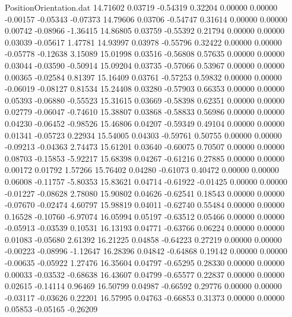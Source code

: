 \begin{filecontents}{PositionOrientation.dat}
  14.71602    0.03719   -0.54319     0.32204    0.00000    0.00000   -0.00157   -0.05343   -0.07373
  14.79606    0.03706   -0.54747     0.31614    0.00000    0.00000    0.00742   -0.08966   -1.36415
  14.86805    0.03759   -0.55392     0.21794    0.00000    0.00000    0.03039   -0.05617    1.47781
  14.93997    0.03978   -0.55796     0.32422    0.00000    0.00000   -0.05778   -0.12638    3.15089
  15.01998    0.03516   -0.56808     0.57635    0.00000    0.00000    0.03044   -0.03590   -0.50914
  15.09204    0.03735   -0.57066     0.53967    0.00000    0.00000    0.00365   -0.02584    0.81397
  15.16409    0.03761   -0.57253     0.59832    0.00000    0.00000   -0.06019   -0.08127    0.81534
  15.24408    0.03280   -0.57903     0.66353    0.00000    0.00000    0.05393   -0.06880   -0.55523
  15.31615    0.03669   -0.58398     0.62351    0.00000    0.00000    0.02779   -0.06047   -0.74610
  15.38807    0.03868   -0.58833     0.56986    0.00000    0.00000    0.04230   -0.06452   -0.98526
  15.46806    0.04207   -0.59349     0.49104    0.00000    0.00000    0.01341   -0.05723    0.22934
  15.54005    0.04303   -0.59761     0.50755    0.00000    0.00000   -0.09213   -0.04363    2.74473
  15.61201    0.03640   -0.60075     0.70507    0.00000    0.00000    0.08703   -0.15853   -5.92217
  15.68398    0.04267   -0.61216     0.27885    0.00000    0.00000    0.00172    0.01792    1.57266
  15.76402    0.04280   -0.61073     0.40472    0.00000    0.00000    0.06008   -0.11757   -5.80353
  15.83621    0.04714   -0.61922    -0.01425    0.00000    0.00000   -0.01227   -0.08628    2.78080
  15.90802    0.04626   -0.62541     0.18543    0.00000    0.00000   -0.07670   -0.02474    4.60797
  15.98819    0.04011   -0.62740     0.55484    0.00000    0.00000    0.16528   -0.10760   -6.97074
  16.05994    0.05197   -0.63512     0.05466    0.00000    0.00000   -0.05913   -0.03539    0.10531
  16.13193    0.04771   -0.63766     0.06224    0.00000    0.00000    0.01083   -0.05680    2.61392
  16.21225    0.04858   -0.64223     0.27219    0.00000    0.00000   -0.00223   -0.08996   -1.12647
  16.28396    0.04842   -0.64868     0.19142    0.00000    0.00000   -0.00635   -0.05922    1.27476
  16.35604    0.04797   -0.65295     0.28330    0.00000    0.00000    0.00033   -0.03532   -0.68638
  16.43607    0.04799   -0.65577     0.22837    0.00000    0.00000    0.02615   -0.14114    0.96469
  16.50799    0.04987   -0.66592     0.29776    0.00000    0.00000   -0.03117   -0.03626    0.22201
  16.57995    0.04763   -0.66853     0.31373    0.00000    0.00000    0.05853   -0.05165   -0.26209

\end{filecontents}
